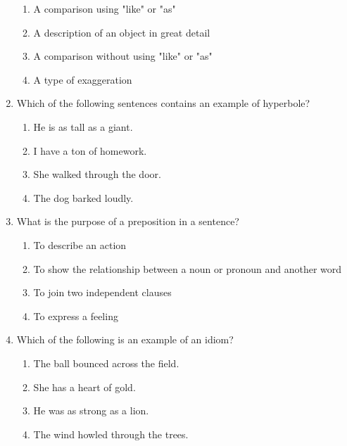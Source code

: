 \documentclass[12pt]{article}
\begin{document}
\begin{enumerate}
    \begin{enumerate}[label=\Alph*.]
        \item A comparison using "like" or "as"
        \item A description of an object in great detail
        \item A comparison without using "like" or "as"
        \item A type of exaggeration
    \end{enumerate}

    \vspace{0.5cm}

    \item Which of the following sentences contains an example of hyperbole?

    \begin{enumerate}[label=\Alph*.]
        \item He is as tall as a giant.
        \item I have a ton of homework.
        \item She walked through the door.
        \item The dog barked loudly.
    \end{enumerate}

    \vspace{0.5cm}

    \item What is the purpose of a preposition in a sentence?

    \begin{enumerate}[label=\Alph*.]
        \item To describe an action
        \item To show the relationship between a noun or pronoun and another word
        \item To join two independent clauses
        \item To express a feeling
    \end{enumerate}

    \vspace{0.5cm}

    \item Which of the following is an example of an idiom?

    \begin{enumerate}[label=\Alph*.]
        \item The ball bounced across the field.
        \item She has a heart of gold.
        \item He was as strong as a lion.
        \item The wind howled through the trees.
    \end{enumerate}


\end{enumerate}
\end{document}
